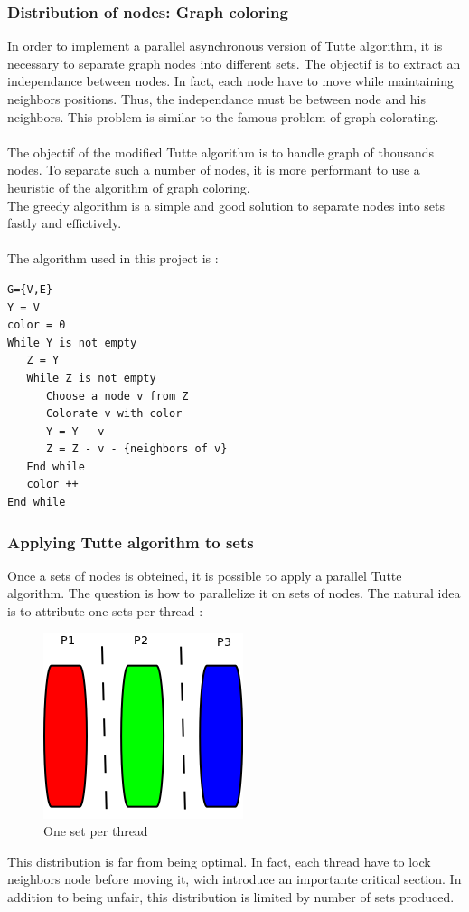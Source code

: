 \subsubsection{Distribution of nodes: Graph coloring}
In order to implement a parallel asynchronous version of Tutte algorithm, it is necessary to separate graph nodes into different sets. The objectif is to extract an independance between nodes. In fact, each node have to move while maintaining neighbors positions. Thus, the independance must be between node and his neighbors. This problem is similar to the famous problem of graph colorating.
\paragraph*{}
The objectif of the modified Tutte algorithm is to handle graph of thousands nodes. To separate such a number of nodes, it is more performant to use a heuristic of the algorithm of graph coloring.\\
The greedy algorithm is a simple and good solution to separate nodes into sets fastly and effictively.
\paragraph*{}
The algorithm used in this project is :
\begin{verbatim}
G={V,E}
Y = V
color = 0
While Y is not empty
   Z = Y
   While Z is not empty
      Choose a node v from Z
      Colorate v with color
      Y = Y - v
      Z = Z - v - {neighbors of v}
   End while
   color ++
End while
\end{verbatim}
\subsubsection{Applying Tutte algorithm to sets}
Once a sets of nodes is obteined, it is possible to apply a parallel Tutte algorithm. The question is how to parallelize it on sets of nodes. The natural idea is to attribute one sets per thread :
\begin{figure}[!h]
\centering
\includegraphics[scale=0.5]{img/distribution_verticale.png}
\caption{One set per thread}
\end{figure}
This distribution is far from being optimal. In fact, each thread have to lock neighbors node before moving it, wich introduce an importante critical section. In addition to being unfair, this distribution is limited by number of sets produced.\\

